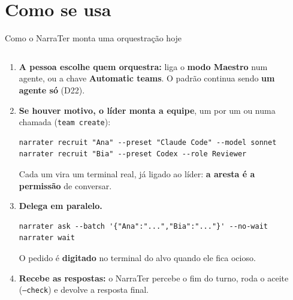 \documentclass[11pt,aspectratio=169]{beamer}
\begin{document}
\section{Como se usa}

\begin{frame}[fragile]{Como o NarraTer monta uma orquestração hoje}
\begin{columns}[T]
\begin{column}{0.49\linewidth}
\scriptsize
\begin{enumerate}\setlength\itemsep{0.25em}
\item \textbf{A pessoa escolhe quem orquestra:} liga o \textbf{modo Maestro} num agente, ou a chave
  \textbf{Automatic teams}. O padrão continua sendo \textbf{um agente só} (D22).
\item \textbf{Se houver motivo, o líder monta a equipe}, um por um ou numa chamada (\texttt{team create}):
\begin{lstlisting}[basicstyle=\ttfamily\tiny, breaklines=false]
narrater recruit "Ana" --preset "Claude Code" --model sonnet
narrater recruit "Bia" --preset Codex --role Reviewer
\end{lstlisting}
  Cada um vira um terminal real, já ligado ao líder: \textbf{a aresta é a permissão} de conversar.
\item \textbf{Delega em paralelo.}
\begin{lstlisting}[basicstyle=\ttfamily\tiny, breaklines=false]
narrater ask --batch '{"Ana":"...","Bia":"..."}' --no-wait
narrater wait
\end{lstlisting}
  O pedido é \textbf{digitado} no terminal do alvo quando ele fica ocioso.
\item \textbf{Recebe as respostas:} o NarraTer percebe o fim do turno, roda o aceite (\texttt{--check}) e devolve a resposta final.
\end{enumerate}
\end{column}
\begin{column}{0.49\linewidth}
\centering
\begin{tikzpicture}[>=Stealth, font=\scriptsize, y=0.82cm,
  term/.style={draw=linha, fill=fundo, rounded corners=3pt, minimum width=2.15cm, minimum height=0.95cm, align=center},
  nota/.style={draw=alerta!60, fill=alerta!10, minimum width=1.5cm, minimum height=0.7cm, align=center},
  aresta/.style={acento, thick}]

\end{tikzpicture}
\end{column}
\end{columns}
\end{frame}
\end{document}
